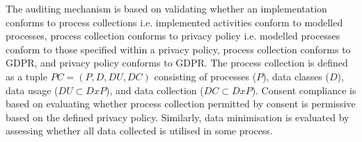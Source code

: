 The auditing mechanism is based on validating whether an implementation conforms to process collections i.e. implemented activities conform to modelled processes, process collection conforms to privacy policy i.e. modelled processes conform to those specified within a privacy policy, process collection conforms to GDPR, and privacy policy conforms to GDPR.
The process collection is defined as a tuple $PC = (P,D,DU,DC)$ consisting of processes ($P$), data classes ($D$), data usage ($DU\subset D x P$), and data collection ($DC\subset D x P$). Consent compliance is based on evaluating whether process collection permitted by consent is permissive based on the defined privacy policy. Similarly, data minimisation is evaluated by assessing whether all data collected is utilised in some process.


